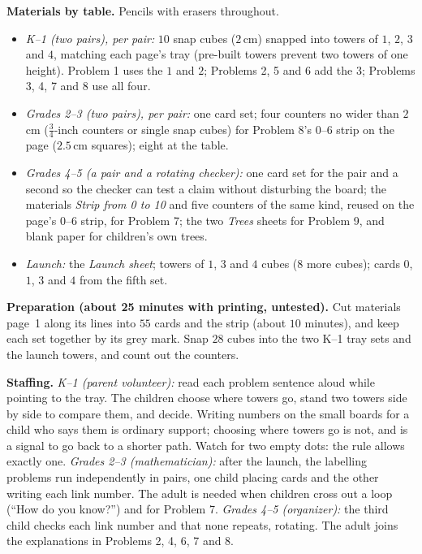 \documentclass[11pt]{article}
\begin{document}
\textbf{Materials by table.} Pencils with erasers throughout.
\begin{itemize}
\item \emph{K--1 (two pairs), per pair:} $10$ snap cubes ($2$\,cm) snapped into towers of $1$, $2$, $3$ and $4$, matching each page's tray (pre-built towers prevent two towers of one height). Problem 1 uses the $1$ and $2$; Problems 2, 5 and 6 add the $3$; Problems 3, 4, 7 and 8 use all four.
\item \emph{Grades 2--3 (two pairs), per pair:} one card set; four counters no wider than $2$\,cm ($\tfrac34$-inch counters or single snap cubes) for Problem 8's $0$--$6$ strip on the page ($2.5$\,cm squares); eight at the table.
\item \emph{Grades 4--5 (a pair and a rotating checker):} one card set for the pair and a second so the checker can test a claim without disturbing the board; the materials \emph{Strip from 0 to 10} and five counters of the same kind, reused on the page's $0$--$6$ strip, for Problem 7; the two \emph{Trees} sheets for Problem 9, and blank paper for children's own trees.
\item \emph{Launch:} the \emph{Launch sheet}; towers of $1$, $3$ and $4$ cubes ($8$ more cubes); cards $0$, $1$, $3$ and $4$ from the fifth set.
\end{itemize}
\textbf{Preparation (about 25 minutes with printing, untested).} Cut materials page~1 along its lines into $55$ cards and the strip (about $10$ minutes), and keep each set together by its grey mark. Snap $28$ cubes into the two K--1 tray sets and the launch towers, and count out the counters.

\textbf{Staffing.} \emph{K--1 (parent volunteer):} read each problem sentence aloud while pointing to the tray. The children choose where towers go, stand two towers side by side to compare them, and decide. Writing numbers on the small boards for a child who says them is ordinary support; choosing where towers go is not, and is a signal to go back to a shorter path. Watch for two empty dots: the rule allows exactly one. \emph{Grades 2--3 (mathematician):} after the launch, the labelling problems run independently in pairs, one child placing cards and the other writing each link number. The adult is needed when children cross out a loop (``How do you know?'') and for Problem 7. \emph{Grades 4--5 (organizer):} the third child checks each link number and that none repeats, rotating. The adult joins the explanations in Problems 2, 4, 6, 7 and 8.
\end{document}
